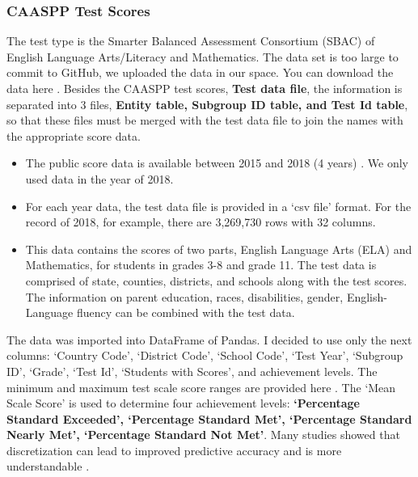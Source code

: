 \documentclass[11pt]{article}
\begin{document}
\subsubsection{CAASPP Test Scores}
The test type is the Smarter Balanced Assessment Consortium (SBAC) of English Language Arts/Literacy and Mathematics.
The data set is too large to commit to GitHub, we uploaded the data in our space. You can download the data here \cite{CAASPP_download}.
Besides the CAASPP test scores, \textbf{Test data file},
the information is separated into 3 files, 
\textbf{Entity table, Subgroup ID table, and Test Id table},
so that these files must be merged with the test data file to join the names with the appropriate score data.

\begin{itemize}
\item
  The public score data is available between 2015 and 2018 (4 years)  \cite{california_dep_education, california_dep_education_caaspp, CAASPP_research}. We only used data in the year of 2018. 
\item 
For each year data, the test data file is provided in a `csv file' format. For the record of 2018, for example, there are 3,269,730 rows with 32 columns.
\item 
This data contains the scores of two parts, English Language Arts (ELA) and Mathematics, for students in grades 3-8 and grade 11. The test data is comprised of state, counties, districts, and schools along with the test scores. The information on parent education, races, disabilities, gender, English-Language fluency can be combined with the test data. 
\end{itemize}

The data was imported into DataFrame of Pandas. I decided to use only the next columns: `Country Code', `District Code', `School Code', `Test Year', `Subgroup ID', `Grade', `Test Id', `Students with Scores', and achievement levels. The minimum and maximum test scale score ranges are provided here \cite{score_range}. The `Mean Scale Score' is used to determine four achievement levels: 
%
\textbf{‘Percentage Standard Exceeded’, ‘Percentage Standard Met’, ‘Percentage Standard Nearly Met’, ‘Percentage Standard Not Met’}. Many studies showed that discretization can lead to improved predictive accuracy and is more understandable \cite{Discretization}.
\end{document}
